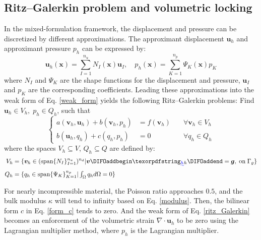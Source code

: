 \subsection{Ritz--Galerkin problem and volumetric locking}
In the mixed-formulation framework, the displacement and pressure can be discretized by different approximations. The approximant displacement $\boldsymbol{u}_h$ and approximant pressure $p_h$ can be expressed by:
\begin{equation}
\boldsymbol{u}_h(\boldsymbol{x}) = \sum_{I = 1}^{n_u} N_I(\boldsymbol{x}) \boldsymbol{u}_I, \quad
p_h(\boldsymbol{x}) = \sum_{K = 1}^{n_p} \Psi_K(\boldsymbol{x}) p_K
\end{equation}
where $N_I$ and $\Psi_K$ are the shape functions for the displacement and pressure, $\boldsymbol u_I$ and $p_K$ are the corresponding coefficients.
Leading these approximations into the weak form of Eq. \eqref{weak_form} yields the following Ritz--Galerkin problems:
Find $\boldsymbol{u}_h \in V_h, \; p_h \in Q_h$, such that
\begin{equation}\label{ritz_Galerkin}
\left\{
\begin{aligned}
a(\boldsymbol{v}_h, \boldsymbol{u}_h) + b(\boldsymbol{v}_h, p_h) &= f(\boldsymbol{v}_h) \quad &\forall \boldsymbol{v}_h \in V_h \\
b(\boldsymbol{u}_h, q_h) + c(q_h, p_h) &= 0 \quad &\forall q_h \in Q_h
\end{aligned}
\right.
\end{equation}
where the spaces $V_h \subseteq V$, $Q_h \subseteq Q$ are defined by:
\begin{align}
V_h &= \{\boldsymbol v_h \in (\mathrm{span}\{N_I\}_{I=1}^{n_u})^{n_d} \vert \boldsymbol v \DIFaddbegin \DIFadd{_h }\DIFaddend = \boldsymbol g,\; \mathrm{on} \; \Gamma_g\}
\\
Q_h &= \{q_h \in \mathrm{span}\{\Psi_K\}_{K=1}^{n_p} \vert \textstyle \int_{\Omega} q_h d\Omega = 0\}
\end{align}

For nearly incompressible material, the Poisson ratio approaches $0.5$, and the bulk modulus $\kappa$ will tend to infinity based on Eq. \eqref{modulus}. Then, the bilinear form $c$ in Eq. \eqref{form_c} tends to zero. And the weak form of Eq. \eqref{ritz_Galerkin} becomes an enforcement of the volumetric strain $\nabla \cdot \boldsymbol{u}_h$ to be zero using the Lagrangian multiplier method, where $p_h$ is the Lagrangian multiplier.

